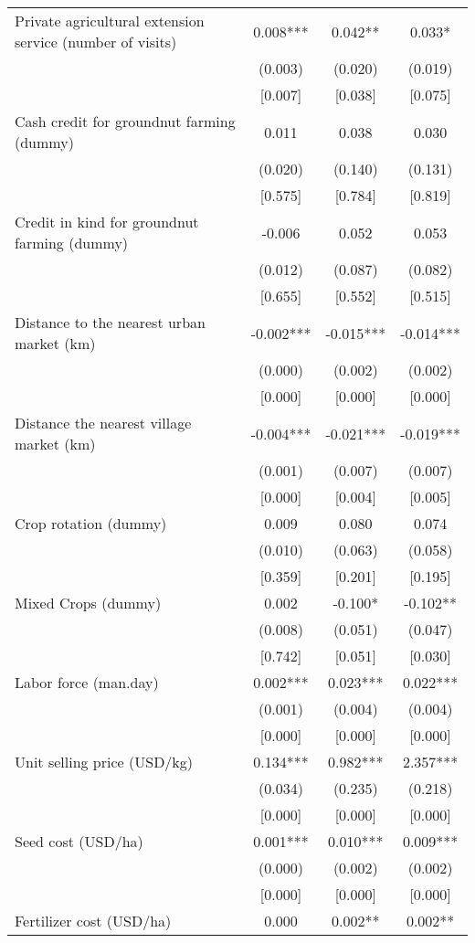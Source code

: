 \documentclass[]{article}
\begin{document}
\begin{tabular}{lccc}
Private agricultural extension service (number of visits) & 0.008*** & 0.042** & 0.033* \\
 & (0.003) & (0.020) & (0.019) \\
 & [0.007] & [0.038] & [0.075] \\
Cash credit for groundnut farming (dummy) & 0.011 & 0.038 & 0.030 \\
 & (0.020) & (0.140) & (0.131) \\
 & [0.575] & [0.784] & [0.819] \\
Credit in kind for groundnut farming (dummy) & -0.006 & 0.052 & 0.053 \\
 & (0.012) & (0.087) & (0.082) \\
 & [0.655] & [0.552] & [0.515] \\
Distance to the nearest urban market (km) & -0.002*** & -0.015*** & -0.014*** \\
 & (0.000) & (0.002) & (0.002) \\
 & [0.000] & [0.000] & [0.000] \\
Distance the nearest village market (km) & -0.004*** & -0.021*** & -0.019*** \\
 & (0.001) & (0.007) & (0.007) \\
 & [0.000] & [0.004] & [0.005] \\
Crop rotation (dummy) & 0.009 & 0.080 & 0.074 \\
 & (0.010) & (0.063) & (0.058) \\
 & [0.359] & [0.201] & [0.195] \\
Mixed Crops (dummy) & 0.002 & -0.100* & -0.102** \\
 & (0.008) & (0.051) & (0.047) \\
 & [0.742] & [0.051] & [0.030] \\
Labor force (man.day) & 0.002*** & 0.023*** & 0.022*** \\
 & (0.001) & (0.004) & (0.004) \\
 & [0.000] & [0.000] & [0.000] \\
Unit selling price (USD/kg) & 0.134*** & 0.982*** & 2.357*** \\
 & (0.034) & (0.235) & (0.218) \\
 & [0.000] & [0.000] & [0.000] \\
Seed cost (USD/ha) & 0.001*** & 0.010*** & 0.009*** \\
 & (0.000) & (0.002) & (0.002) \\
 & [0.000] & [0.000] & [0.000] \\
Fertilizer cost (USD/ha) & 0.000 & 0.002** & 0.002** \\

\end{tabular}
\end{document}
